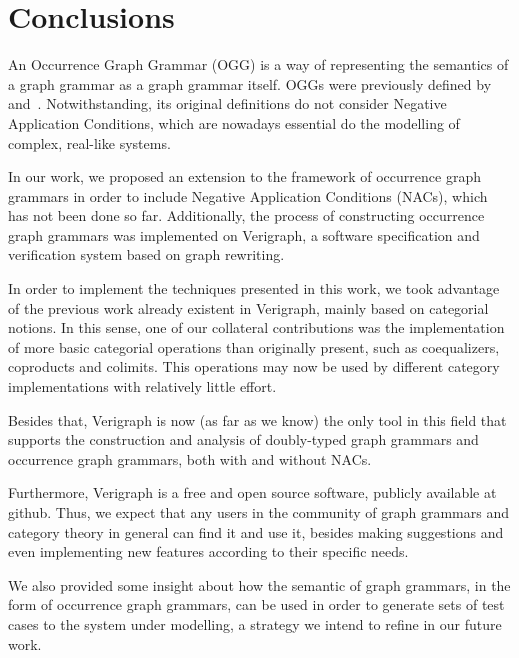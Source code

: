 \chapter{Conclusions}\label{ch:conclusions}

An Occurrence Graph Grammar (OGG) is a way of representing the semantics of a graph grammar as a graph grammar itself. OGGs were previously defined by~\cite{Ribeiro1996} and~\cite{Corradini1996}. Notwithstanding, its original definitions do not consider Negative Application Conditions, which are nowadays essential do the modelling of complex, real-like systems.

  In our work, we proposed an extension to the framework of occurrence graph grammars in order to include Negative Application Conditions (NACs), which has not been done so far. Additionally, the process of constructing occurrence graph grammars was implemented on Verigraph, a software specification and verification system based on graph rewriting.%


In order to implement the techniques presented in this work, we took advantage of the previous work already existent in Verigraph, mainly based on categorial notions. In this sense, one of our collateral contributions was the implementation of more basic categorial operations than originally present, such as coequalizers, coproducts and colimits. This operations may now be used by different category implementations with relatively little effort. 

Besides that, Verigraph is now (as far as we know) the only tool in this field that supports the construction and analysis of doubly-typed graph grammars and occurrence graph grammars, both with and without NACs.

    Furthermore, Verigraph is a free and open source software, publicly available at github. Thus, we expect that any users in the community of graph grammars and category theory in general can find it and use it, besides making suggestions and even implementing new features according to their specific needs.

We also provided some insight about how the semantic of graph grammars, in the form of occurrence graph grammars, can be used in order to generate sets of test cases to the system under modelling, a strategy we intend to refine in our future work.

